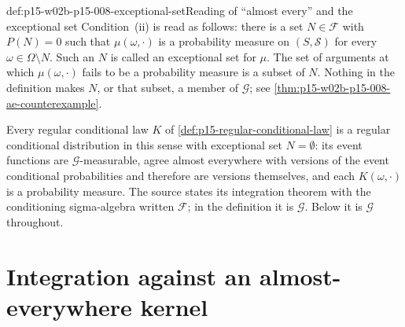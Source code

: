 \begin{hbconvention}{def:p15-w02b-p15-008-exceptional-set}{Reading of ``almost every'' and the exceptional set}
Condition~(ii) is read as follows: there is a set \(N\in\mathcal F\) with
\(P(N)=0\) such that \(\mu(\omega,\cdot)\) is a probability measure on
\((S,\mathcal S)\) for every \(\omega\in\Omega\setminus N\).
Such an \(N\) is called an exceptional set for \(\mu\).
The set of arguments at which \(\mu(\omega,\cdot)\) fails to be a
probability measure is a subset of \(N\). Nothing in the definition makes
\(N\), or that subset, a member of \(\mathcal G\); see
\cref{thm:p15-w02b-p15-008-ae-counterexample}.
\end{hbconvention}

Every regular conditional law \(K\) of
\cref{def:p15-regular-conditional-law} is a regular conditional
distribution in this sense with exceptional set \(N=\emptyset\): its
event functions are \(\mathcal G\)-measurable, agree almost everywhere with
versions of the event conditional probabilities and therefore are versions
themselves, and each \(K(\omega,\cdot)\) is a probability measure.
The source states its integration theorem with the conditioning
sigma-algebra written \(\mathcal F\); in the definition it is
\(\mathcal G\). Below it is \(\mathcal G\) throughout.

\section{Integration against an almost-everywhere kernel}
\label{sec:p15-w02b-p15-008-integration}

